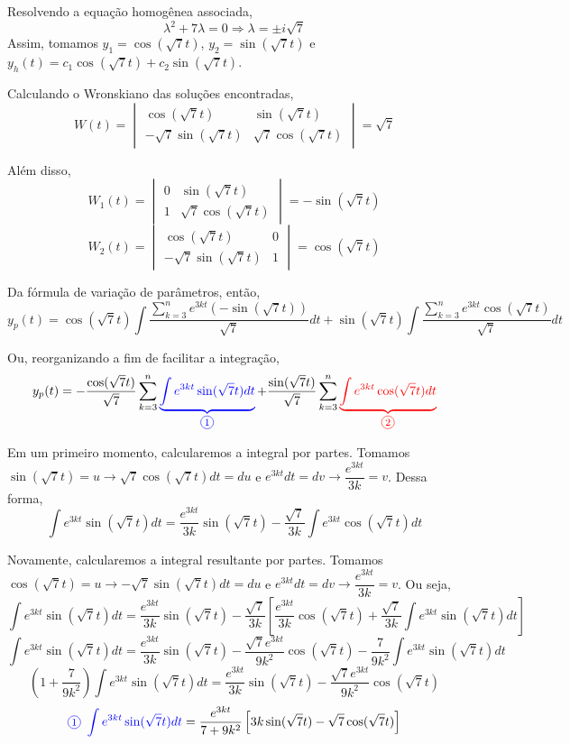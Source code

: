 \documentclass[oneside,12pt,a4paper]{report}
\begin{document}
\begin{resolucao}
    Resolvendo a equação homogênea associada,
    \[\lambda^2+7\lambda=0\Rightarrow\lambda=\pm i\sqrt{7}\]
    Assim, tomamos $y_1=\cos(\sqrt{7}t)$, $y_2=\sin(\sqrt{7}t)$ e $y_h(t)=c_1\cos(\sqrt{7}t)+c_2\sin(\sqrt{7}t)$.

    Calculando o Wronskiano das soluções encontradas,
    \[W(t)=\begin{vmatrix}
        \cos(\sqrt{7}t)          & \sin(\sqrt{7}t)\\
        -\sqrt{7}\sin(\sqrt{7}t) & \sqrt{7}\cos(\sqrt{7}t)
    \end{vmatrix}=\sqrt{7}\]

    Além disso,
    \[W_1(t)=\begin{vmatrix}
        0 & \sin(\sqrt{7}t)\\
        1 & \sqrt{7}\cos(\sqrt{7}t)
    \end{vmatrix}=-\sin(\sqrt{7}t)\]
    \[W_2(t)=\begin{vmatrix}
        \cos(\sqrt{7}t)          & 0\\
        -\sqrt{7}\sin(\sqrt{7}t) & 1
    \end{vmatrix}=\cos(\sqrt{7}t)\]

    Da fórmula de variação de parâmetros, então,
    \[ y_p(t)=\cos(\sqrt{7}t)\int\frac{\sum_{k=3}^{n}e^{3kt}(-\sin(\sqrt{7}t))}{\sqrt{7}}dt+\sin(\sqrt{7}t)\int\frac{\sum_{k=3}^{n}e^{3kt}\cos(\sqrt{7}t)}{\sqrt{7}}dt\]

    Ou, reorganizando a fim de facilitar a integração,
    \[ y_p(t)=-\frac{\cos(\sqrt{7}t)}{\sqrt{7}}\sum_{k=3}^{n}\color{blue}\underbrace{\int e^{3kt}\sin(\sqrt{7}t)dt}_{\circled{1}}\color{black}+\frac{\sin(\sqrt{7}t)}{\sqrt{7}}\sum_{k=3}^{n}\color{red}{\underbrace{\int e^{3kt}\cos(\sqrt{7}t)dt}_{\circled{2}}}\]

    Em um primeiro momento, calcularemos a integral  por partes. Tomamos $\sin(\sqrt{7}t)=u\rightarrow\sqrt{7}\cos(\sqrt{7}t)dt=du$ e $e^{3kt}dt=dv\rightarrow\dfrac{e^{3kt}}{3k}=v$. Dessa forma,
    \[\int e^{3kt}\sin(\sqrt{7}t)dt=\frac{e^{3kt}}{3k}\sin(\sqrt{7}t)-\frac{\sqrt{7}}{3k}\int e^{3kt}\cos(\sqrt{7}t)dt\]

    Novamente, calcularemos a integral resultante por partes. Tomamos $\cos(\sqrt{7}t)=u\rightarrow-\sqrt{7}\sin(\sqrt{7}t)dt=du$ e $e^{3kt}dt=dv\rightarrow\dfrac{e^{3kt}}{3k}=v$. Ou seja,
    \[\int e^{3kt}\sin(\sqrt{7}t)dt=\frac{e^{3kt}}{3k}\sin(\sqrt{7}t)-\frac{\sqrt{7}}{3k}\left[\frac{e^{3kt}}{3k}\cos(\sqrt{7}t)+\frac{\sqrt{7}}{3k}\int e^{3kt}\sin(\sqrt{7}t)dt\right]\]
    \[\int e^{3kt}\sin(\sqrt{7}t)dt=\frac{e^{3kt}}{3k}\sin(\sqrt{7}t)-\frac{\sqrt{7}e^{3kt}}{9k^2}\cos(\sqrt{7}t)-\frac{7}{9k^2}\int e^{3kt}\sin(\sqrt{7}t)dt\]
    \[\left(1+\frac{7}{9k^2}\right)\int e^{3kt}\sin(\sqrt{7}t)dt=\frac{e^{3kt}}{3k}\sin(\sqrt{7}t)-\frac{\sqrt{7}e^{3kt}}{9k^2}\cos(\sqrt{7}t)\]
    \[\color{blue}\text{\circled{1} }\int e^{3kt}\sin(\sqrt{7}t)dt\color{black}=\frac{e^{3kt}}{7+9k^2}\left[3k\sin(\sqrt{7}t)-\sqrt{7}\cos(\sqrt{7}t)\right]\]


\end{resolucao}
\end{document}
